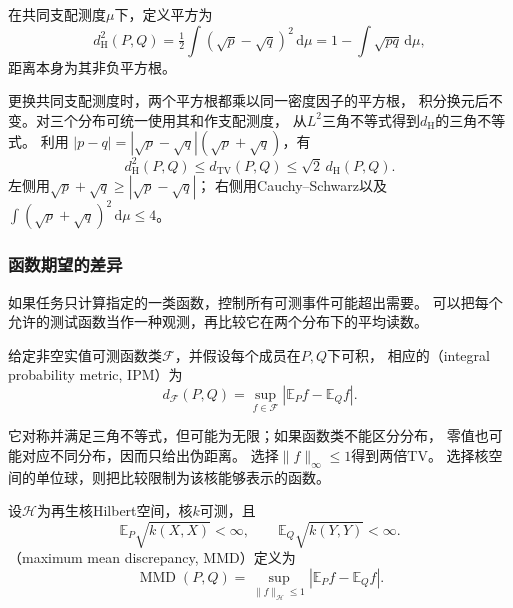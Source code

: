 \begin{definition}[Hellinger距离]
\label{def:information-hellinger-distance}
在共同支配测度\(\mu\)下，定义平方为
\begin{equation}
  d_{\mathrm H}^2(P,Q)=\tfrac12\int(\sqrt p-\sqrt q)^2\,\mathrm d\mu
   =1-\int\sqrt{pq}\,\mathrm d\mu,
  \label{eq:information-hellinger}
\end{equation}
距离本身为其非负平方根。
\end{definition}
更换共同支配测度时，两个平方根都乘以同一密度因子的平方根，
积分换元后不变。对三个分布可统一使用其和作支配测度，
从\(L^2\)三角不等式得到\(d_{\mathrm H}\)的三角不等式。
利用
\(|p-q|=|\sqrt p-\sqrt q|(\sqrt p+\sqrt q)\)，有
\[
  d_{\mathrm H}^2(P,Q)\leq d_{\mathrm{TV}}(P,Q)
  \leq\sqrt2\,d_{\mathrm H}(P,Q).
\]
左侧用\(\sqrt p+\sqrt q\geq|\sqrt p-\sqrt q|\)；
右侧用Cauchy--Schwarz以及
\(\int(\sqrt p+\sqrt q)^2\,\mathrm d\mu\leq4\)。

\subsubsection{函数期望的差异}
\label{sec:information-test-functions}

如果任务只计算指定的一类函数，控制所有可测事件可能超出需要。
可以把每个允许的测试函数当作一种观测，再比较它在两个分布下的平均读数。

\begin{definition}[积分概率度量]
\label{def:information-ipm}
给定非空实值可测函数类\(\mathcal F\)，并假设每个成员在\(P,Q\)下可积，
相应的（integral probability metric, IPM）为
\begin{equation}
  d_{\mathcal F}(P,Q)=\sup_{f\in\mathcal F}
           |\mathbb E_Pf-\mathbb E_Qf|.
  \label{eq:information-ipm}
\end{equation}
\end{definition}
它对称并满足三角不等式，但可能为无限；如果函数类不能区分分布，
零值也可能对应不同分布，因而只给出伪距离。
选择\(\|f\|_\infty\leq1\)得到两倍TV。
选择核空间的单位球，则把比较限制为该核能够表示的函数。

\begin{definition}[最大均值差异]
\label{def:information-mmd}
设\(\mathcal H\)为再生核Hilbert空间，核\(k\)可测，且
\[
  \mathbb E_P\sqrt{k(X,X)}<\infty,\qquad
  \mathbb E_Q\sqrt{k(Y,Y)}<\infty.
\]
（maximum mean discrepancy, MMD）定义为
\[
  \operatorname{MMD}(P,Q)=
   \sup_{\|f\|_{\mathcal H}\leq1}|\mathbb E_Pf-\mathbb E_Qf|.
\]
\end{definition}

